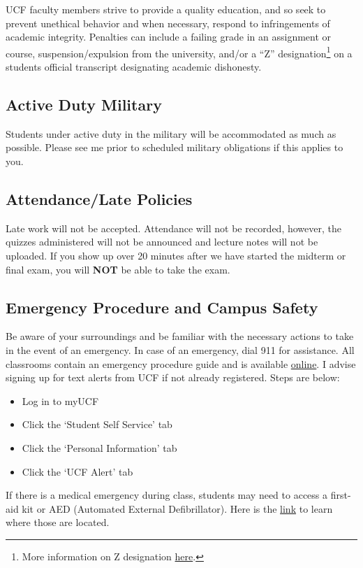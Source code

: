 \documentclass[11pt]{paper}
\begin{document}
UCF faculty members strive to provide a quality education, and so seek to prevent unethical behavior and when necessary, respond to infringements of academic integrity. Penalties can include a failing grade in an assignment or course, suspension/expulsion from the university, and/or a ``Z'' designation\footnote{More information on Z designation \href{https://goldenrule.sdes.ucf.edu/zgrade}{here}.} on a students official transcript designating academic dishonesty. 

\subsection{Active Duty Military}
Students under active duty in the military will be accommodated as much as possible. Please see me  prior to scheduled military obligations if this applies to you.
\subsection{Attendance/Late Policies}
Late work will not be accepted. Attendance will not be recorded, however, the quizzes administered will not be announced and lecture notes will not be uploaded. If you show up over 20 minutes after we have started the midterm or final exam, you will \textbf{NOT} be able to take the exam.
\subsection{Emergency Procedure and Campus Safety}
Be aware of your surroundings and be familiar with the necessary actions to take in the event of an emergency. In case of an emergency, dial 911 for assistance. All classrooms contain an emergency procedure guide and is available \href{http://emergency.ucf.edu/emergency_guide.html}{online}. I advise signing up for text alerts from UCF if not already registered. Steps are below:
\begin{itemize}
	\item Log in to myUCF
	\item Click the `Student Self Service' tab
	\item Click the `Personal Information' tab
	\item Click the `UCF Alert' tab
\end{itemize} 

If there is a medical emergency during class, students may need to access a
first-aid kit or AED (Automated External Defibrillator). Here is the \href{http://www.ehs.ucf.edu/AEDlocations-UCF}{link} to learn where those are located.\\
\end{document}
